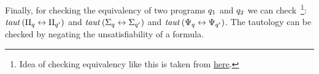 \documentclass[12pt]{article}
\newcommand{\secref}[1]{\hyperref[sec:#1]{Section~\ref*{sec:#1}}}
\begin{document}
Finally, for checking the equivalency of two programs $\vQ_1$ and $\vQ_2$ we can check~\footnote{Idea of checking equivalency like this is taken from \href{https://resources.mpi-inf.mpg.de/departments/rg1/conferences/vtsa12/slides/biere/Biere-VTSA12-talk.pdf}{here}.}:
$\taut {\Pi_\vQ \leftrightarrow \Pi_{\vQ^\prime}}$
and $\taut {\Sigma_\vQ \leftrightarrow \Sigma_{\vQ^\prime}}$ and $\taut {\Psi_\vQ \leftrightarrow \Psi_{\vQ^\prime}}$. The tautology can be checked by negating the unsatisfiability of a formula.

\begin{comment}
I generate multiple SAT formulas to check:
1) if variations used in the query are valid (reasonable),
e.g., the variation in $\chc [\f] {\vQ_1, \vQ_2}$ is not reasonable 
although the query is type correct, elaborated in \secref{val},
2) if dead alternative branches exist in a choice, e.g., 
the alternative branch $\vQ_2$ will never be executed in the 
query $\chc [\fName_1] {\chc [\fName_1 \vee \fName_2] {\vQ_1, \vQ_2} \vQ_3}$, 
elaborated in \secref{dead},
and 
3) if a choice has redundancy (this relies on having a structurally equivalence
relation for the pure relational queries), e.g., the $\vQ_1$ subquery is redundant in the query 
$\chc [\dimMeta_1] {\vQ_1, \chc [\dimMeta_2] {\vQ_1, \vQ_2}}$, elaborated in \secref{red}.
Since the VRA is inductive I generate these SAT problems in a bottom-up
approach while keeping and updating an environment of variables introduced 
for the formulas.

I generate fresh variables as follows as the first step for generating each SAT formula:

\begin{itemize}
\item Attribute names are denoted by variables $\att_1, \att_2, \cdots$. Note that the empty attribute is associated with \t.
\item Conditions are denoted by variables $\cond_1, \cond_2, \cdots$ except for the variational conditions.
Note that it is easy to define semantically equivalence on pure relational conditions, thus, there is no need
to break down the conditions except for variational ones. Also, especially since we are not concern with
semantical equivalence in this project.
\item Relations are denoted by variables $\vRel_1, \vRel_2, \cdots$. And the empty relation \empRel\ is associated with \t. 
\item The same feature names are used as their variables in the generated formula. 
\item The subqueries are denoted by variables $\vQ_1, \vQ_2, \cdots$ and are generated bottom-up.
\end{itemize}




\end{comment}
\end{document}
